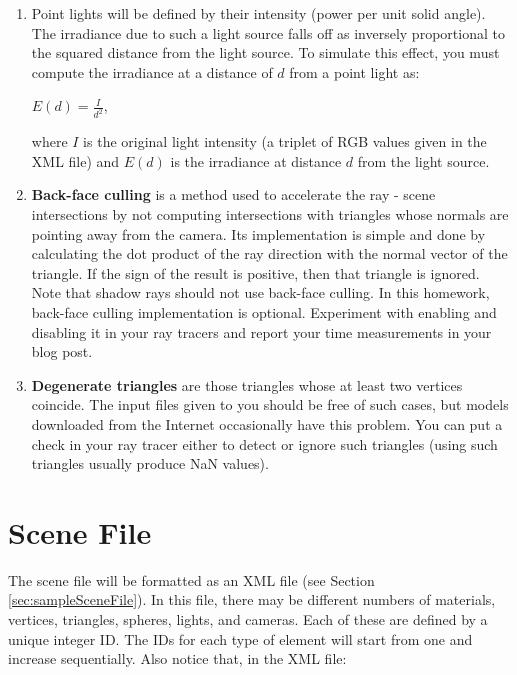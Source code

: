\documentclass[12pt]{article}
\begin{document}
\begin{enumerate}
\item \textbf{}Point lights will be defined by their intensity (power
        per unit solid angle). The irradiance due to such a light source
falls off as inversely proportional to the squared distance from the
light source. To simulate this effect, you must compute the irradiance
at a distance of $d$ from a point light as:
%
\begin{center}
$E(d) = \frac{I}{d^2}$,
\end{center}
%
where $I$ is the original light intensity (a triplet of RGB values given
in the XML file) and $E(d)$ is the irradiance at distance $d$
from the light source.

\item \textbf{Back-face culling} is a method used to accelerate the ray
- scene intersections by not computing intersections with triangles
whose normals are pointing away from the camera. Its implementation is
simple and done by calculating the dot product of the ray direction with
the normal vector of the triangle. If the sign of the result is
positive, then that triangle is ignored. Note that shadow rays should
not use back-face culling. In this homework, back-face culling
implementation is optional. Experiment with enabling and disabling it in
your ray tracers and report your time measurements in your blog post.

\item \textbf{Degenerate triangles} are those triangles whose at least
two vertices coincide.  The input files given to you should be free of
such cases, but models downloaded from the Internet occasionally have
this problem. You can put a check in your ray tracer either to detect or
ignore such triangles (using such triangles usually produce NaN values).

\end{enumerate}

\section{Scene File}
\label{sec:sceneFile}

\noindent The scene file will be formatted as an XML file
(see Section \ref{sec:sampleSceneFile}). In this file, there
may be different numbers of materials, vertices, triangles,
spheres, lights, and cameras. Each of these are defined
by a unique integer ID. The IDs for each type of element
will start from one and increase sequentially. Also
notice that, in the XML file:\\
\end{document}
